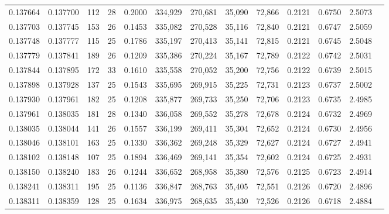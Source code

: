 \begin{tabular}{rrrrrrrrrrrrr}
0.137664 & 0.137700 & 112 &  28 &                                     0.2000 & 334,929 & 270,681 &  35,090 &  72,866 & 0.2121 & 0.6750 & 2.5073 \\
0.137703 & 0.137745 & 153 &  26 &                                     0.1453 & 335,082 & 270,528 &  35,116 &  72,840 & 0.2121 & 0.6747 & 2.5059 \\
0.137748 & 0.137777 & 115 &  25 &                                     0.1786 & 335,197 & 270,413 &  35,141 &  72,815 & 0.2121 & 0.6745 & 2.5048 \\
0.137779 & 0.137841 & 189 &  26 &                                     0.1209 & 335,386 & 270,224 &  35,167 &  72,789 & 0.2122 & 0.6742 & 2.5031 \\
0.137844 & 0.137895 & 172 &  33 &                                     0.1610 & 335,558 & 270,052 &  35,200 &  72,756 & 0.2122 & 0.6739 & 2.5015 \\
0.137898 & 0.137928 & 137 &  25 &                                     0.1543 & 335,695 & 269,915 &  35,225 &  72,731 & 0.2123 & 0.6737 & 2.5002 \\
0.137930 & 0.137961 & 182 &  25 &                                     0.1208 & 335,877 & 269,733 &  35,250 &  72,706 & 0.2123 & 0.6735 & 2.4985 \\
0.137961 & 0.138035 & 181 &  28 &                                     0.1340 & 336,058 & 269,552 &  35,278 &  72,678 & 0.2124 & 0.6732 & 2.4969 \\
0.138035 & 0.138044 & 141 &  26 &                                     0.1557 & 336,199 & 269,411 &  35,304 &  72,652 & 0.2124 & 0.6730 & 2.4956 \\
0.138046 & 0.138101 & 163 &  25 &                                     0.1330 & 336,362 & 269,248 &  35,329 &  72,627 & 0.2124 & 0.6727 & 2.4941 \\
0.138102 & 0.138148 & 107 &  25 &                                     0.1894 & 336,469 & 269,141 &  35,354 &  72,602 & 0.2124 & 0.6725 & 2.4931 \\
0.138150 & 0.138240 & 183 &  26 &                                     0.1244 & 336,652 & 268,958 &  35,380 &  72,576 & 0.2125 & 0.6723 & 2.4914 \\
0.138241 & 0.138311 & 195 &  25 &                                     0.1136 & 336,847 & 268,763 &  35,405 &  72,551 & 0.2126 & 0.6720 & 2.4896 \\
0.138311 & 0.138359 & 128 &  25 &                                     0.1634 & 336,975 & 268,635 &  35,430 &  72,526 & 0.2126 & 0.6718 & 2.4884 \\

\end{tabular}
